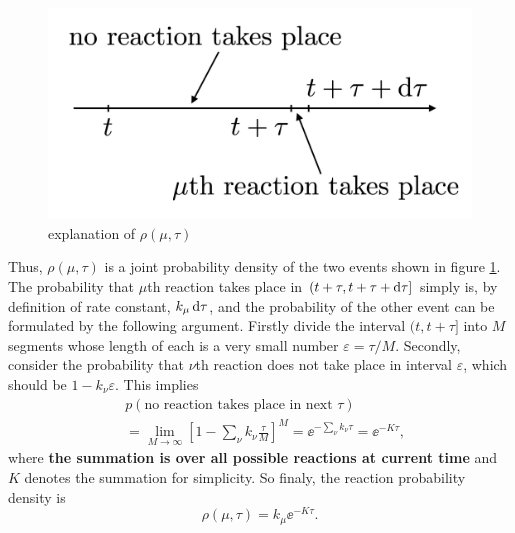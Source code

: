 		\begin{figure}
		\centering
		\includegraphics[scale=0.24]{img/reaction_prob.png}
		\caption{explanation of $\rho(\mu,\tau)$ }
		\label{img:reaction_prob}
		\end{figure}

		Thus, $\rho(\mu,\tau)$ is a joint probability density of the two events shown in figure \ref{img:reaction_prob}. The probability that $\mu$th reaction takes place in $(t+\tau, t+\tau + \operatorname{d\!} \tau]$ simply is, by definition of rate constant, $k_\mu \operatorname{d\!} \tau$, and the probability of the other event can be formulated by the following argument. Firstly divide the interval $(t,t+\tau]$ into $M$ segments whose length of each is a very small number $\varepsilon=\tau / M$. Secondly, consider the probability that $\nu$th reaction does not take place in interval $\varepsilon$, which should be $1-k_\nu\varepsilon$. This implies
		\begin{equation}
			\begin{aligned}
			&p(\text{no reaction takes place in next $\tau$}) \\&=
				\lim_{M\to\infty} \left[ 1-\sum_{\nu}k_\nu\frac{\tau}{M} \right]^{M} 
				=\ee^{-\sum_\nu k_\nu \tau} = \ee^{-K\tau},
			\end{aligned}
			\label{eq:possion}
		\end{equation}
		where \textbf{the summation is over all possible reactions at current time} and $K$ denotes the summation for simplicity. So finaly, the reaction probability density is
		\begin{equation}
			\rho(\mu,\tau) = k_\mu \ee^{-K\tau}.
		\end{equation}

